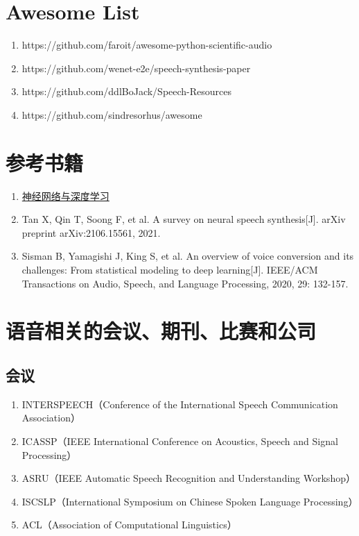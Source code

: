 \documentclass[cn,10pt,math=newtx,citestyle=gb7714-2015,bibstyle=gb7714-2015]{elegantbook}
\begin{document}
\section{Awesome List}
\begin{enumerate}
  \item https://github.com/faroit/awesome-python-scientific-audio
  \item https://github.com/wenet-e2e/speech-synthesis-paper
  \item https://github.com/ddlBoJack/Speech-Resources
  \item https://github.com/sindresorhus/awesome
\end{enumerate}

\section{参考书籍}
\begin{enumerate}
  \item \href{https://nndl.github.io/}{神经网络与深度学习}
  \item Tan X, Qin T, Soong F, et al. A survey on neural speech synthesis[J]. arXiv preprint arXiv:2106.15561, 2021.
  \item Sisman B, Yamagishi J, King S, et al. An overview of voice conversion and its challenges: From statistical modeling to deep learning[J]. IEEE/ACM Transactions on Audio, Speech, and Language Processing, 2020, 29: 132-157.
\end{enumerate}

\section{语音相关的会议、期刊、比赛和公司}
\subsection{会议}
\begin{enumerate}
  \item INTERSPEECH（Conference of the International Speech Communication Association）
  \item ICASSP（IEEE International Conference on Acoustics, Speech and Signal Processing）
  \item ASRU（IEEE Automatic Speech Recognition and Understanding Workshop）
  \item ISCSLP（International Symposium on Chinese Spoken Language Processing）
  \item ACL（Association of Computational Linguistics）
\end{enumerate}
\end{document}
